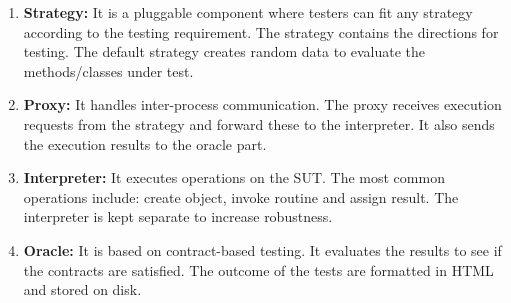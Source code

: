 \begin{enumerate}
\item \textbf{Strategy:} It is a pluggable component where testers can fit any strategy according to the testing requirement. The strategy contains the directions for testing.%
The default strategy creates random data to evaluate the methods/classes under test.
\item \textbf{Proxy:} It handles inter-process communication. The proxy receives execution requests from the strategy and forward these to the interpreter. It also sends the execution results to the oracle part.
\item \textbf{Interpreter:} It executes operations on the SUT. The most common operations include: create object, invoke routine and assign result. The interpreter is kept separate to increase robustness.
\item \textbf{Oracle:} It is based on contract-based testing. It evaluates the results to see if the contracts are satisfied. The outcome of the tests are formatted in HTML and stored on disk.
\end{enumerate}

